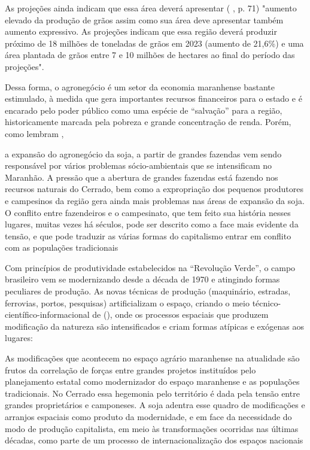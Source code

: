 As projeções ainda indicam que essa área deverá apresentar (\citeauthor{brministerioAgricultura2013} \citeyear{brministerioAgricultura2013}, p. 71) "aumento elevado da produção de grãos assim como sua área deve apresentar também aumento expressivo. As projeções indicam que essa região deverá produzir próximo de 18 milhões de toneladas de grãos em 2023 (aumento de 21,6\%) e uma área plantada de grãos entre 7 e 10 milhões de hectares ao final do período das projeções".

Dessa forma, o agronegócio é um setor da economia maranhense bastante estimulado, à medida que gera importantes recursos financeiros para o estado e é encarado pelo poder público como uma espécie de “salvação” para a região, historicamente marcada pela pobreza e grande concentração de renda. Porém, como lembram ,

\begin{citacao}
a expansão do agronegócio da soja, a partir de grandes fazendas vem sendo responsável por vários problemas sócio-ambientais que se intensificam no Maranhão. A pressão que a abertura de grandes fazendas está fazendo nos recursos naturais do Cerrado, bem como a expropriação dos pequenos produtores e campesinos da região gera ainda mais problemas nas áreas de expansão da soja. O conflito entre fazendeiros e o campesinato, que tem feito sua história nesses lugares, muitas vezes há séculos, pode ser descrito como a face mais evidente da tensão, e que pode traduzir as várias formas do capitalismo entrar em conflito com as populações tradicionais \cite[p. 1]{rodrigues_alencar}
\end{citacao}

Com princípios de produtividade estabelecidos na “Revolução Verde”, o campo brasileiro vem se modernizando desde a década de 1970 e atingindo formas peculiares de produção. As novas técnicas de produção (maquinário, estradas, ferrovias, portos, pesquisas) artificializam o espaço, criando o meio técnico-científico-informacional de  (\citeyear{santos1996}), onde os processos espaciais que produzem modificação da natureza são intensificados e criam formas atípicas e exógenas aos lugares:

\begin{citacao}
As modificações que acontecem no espaço agrário maranhense na atualidade são frutos da correlação de forças entre grandes projetos instituídos pelo planejamento estatal como modernizador do espaço maranhense e as populações tradicionais. No Cerrado essa hegemonia pelo território é dada pela tensão entre grandes proprietários e camponeses. A soja adentra esse quadro de modificações e arranjos espaciais como produto da 
modernidade, e em face da necessidade do modo de produção capitalista, em meio às transformações ocorridas nas últimas décadas, como parte de um processo de internacionalização dos espaços nacionais  \cite[p. 3]{rodrigues_alencar}
\end{citacao}

